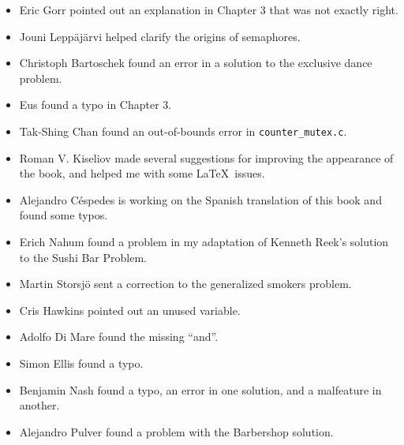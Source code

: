 \documentclass{book}
\begin{document}
\begin{itemize}
    \item Eric Gorr pointed out an explanation in Chapter 3 that was
          not exactly right.

    \item Jouni Lepp\"{a}j\"{a}rvi helped clarify the origins of semaphores.

    \item Christoph Bartoschek found an error in a solution to
          the exclusive dance problem.

    \item Eus found a typo in Chapter 3.

    \item Tak-Shing Chan found an out-of-bounds error in {\tt counter\_mutex.c}.

    \item Roman V. Kiseliov made several suggestions for improving
          the appearance of the book, and helped me with some \LaTeX~issues.

    \item Alejandro C\'{e}spedes is working on the Spanish translation of this
          book and found some typos.

    \item Erich Nahum found a problem in my adaptation of Kenneth Reek's
          solution to the Sushi Bar Problem.

    \item Martin Storsj\"{o} sent a correction to the generalized smokers problem.

    \item Cris Hawkins pointed out an unused variable.

    \item Adolfo Di Mare found the missing ``and''.

    \item Simon Ellis found a typo.

    \item Benjamin Nash found a typo, an error in one solution, and
          a malfeature in another.

    \item Alejandro Pulver found a problem with the Barbershop solution.

\end{itemize}


\renewcommand\cftchapfont{\small\bfseries}
\renewcommand\cftsecfont{\footnotesize}
\renewcommand\cftsubsecfont{\footnotesize}
\renewcommand\cftchappagefont{\small\bfseries}
\renewcommand\cftsecpagefont{\footnotesize}
\renewcommand\cftsubsecpagefont{\footnotesize}
\end{document}
